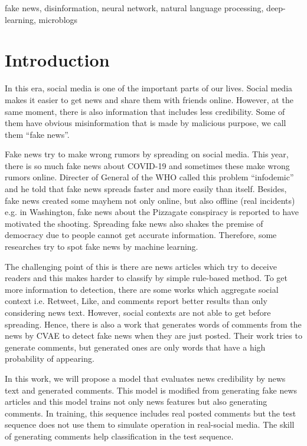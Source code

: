 \documentclass[conference]{IEEEtran}
\begin{document}
\begin{IEEEkeywords}
fake news, disinformation, neural network, natural language processing, deep-learning, microblogs
\end{IEEEkeywords}

\section{Introduction}
In this era, social media is one of the important parts of our lives.
Social media makes it easier to get news and share them with friends online.
However, at the same moment, 
there is also information that includes less credibility.
Some of them have obvious misinformation that is made by malicious purpose,
we call them ``fake news''.

Fake news try to make wrong rumors by spreading on social media.
This year, there is so much fake news about COVID-19 and sometimes these make wrong rumors online.
Directer of General of the WHO called this problem ``infodemic'' and he told that fake news spreads faster and more easily than itself\cite{ZAROCOSTAS2020676}. 
Besides, fake news created some mayhem not only online, but also offline (real incidents)
e.g. in Washington, fake news about the Pizzagate conspiracy is reported to have motivated the shooting\cite{agencies_2016}.
Spreading fake news also shakes the premise of democracy due to people cannot get accurate information.
Therefore, some researches try to spot fake news by machine learning.

The challenging point of this is there are news articles which try to deceive readers
and this makes harder to classify by simple rule-based method.
To get more information to detection,
there are some works which aggregate social context i.e. Retweet, Like, and comments
report better results than only considering news text\cite{Guo:2018:RDH:3269206.3271709}.
However, social contexts are not able to get before spreading.
Hence, there is also a work that generates words of comments from the news by CVAE to detect fake news when they are just posted\cite{ijcai2018-533}.
Their work tries to generate comments, but generated ones are only words that have a high probability of appearing.

In this work, we will propose a model that evaluates news credibility by news text and generated comments.
This model is modified from generating fake news articles\cite{NIPS2019_9106} and this model trains not only news features but also generating comments.
In training, this sequence includes real posted comments but the test sequence does not use them to simulate operation in real-social media.
The skill of generating comments help classification in the test sequence.
\end{document}
